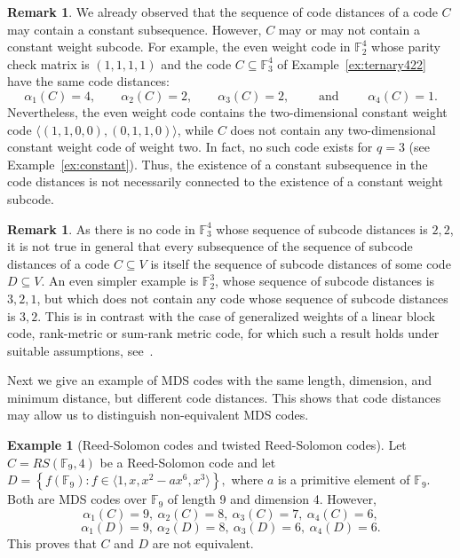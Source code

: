 \documentclass[12pt]{amsart}
\numberwithin{equation}{section}
\theoremstyle{definition}
\newtheorem{remark}[theorem]{Remark}
\newtheorem{example}[theorem]{Example}
\newcommand{\FF}{\mathbb{F}}
\begin{document}
\begin{remark}
We already observed that the sequence of code distances of a code $C$ may contain a constant subsequence. However, $C$ may or may not contain a constant weight subcode. For example, the even weight code in $\FF_2^4$ whose parity check matrix is $(1,1,1,1)$ and the code $C\subseteq\mathbb{F}_3^4$ of Example~\ref{ex:ternary422} have the same code distances:
\[\alpha_1(C)=4, \qquad \alpha_2(C)=2, \qquad \alpha_3(C)=2, \qquad \text{ and } \qquad \alpha_4(C)=1.\]
Nevertheless, the even weight code contains the two-dimensional constant weight code $\langle (1,1,0,0), (0,1,1,0)\rangle$, while $C$ does not contain any two-dimensional constant weight code of weight two. In fact, no such code exists for $q=3$ (see Example~\ref{ex:constant}).
Thus, the existence of a constant subsequence in the code distances is not necessarily connected to the existence of a constant weight subcode.
\end{remark}

\begin{remark}\label{rmk:subcode}
As there is no code in $\mathbb{F}_3^4$ whose sequence of subcode distances is $2,2$, it is not true in general that every subsequence of the sequence of subcode distances of a code $C\subseteq V$ is itself the sequence of subcode distances of some code $D\subseteq V$.
An even simpler example is $\FF_2^3$, whose sequence of subcode distances is $3,2,1$, but which does not contain any code whose sequence of subcode distances is $3,2$. This is in contrast with the case of generalized weights of a linear block code, rank-metric or sum-rank metric code, for which such a result holds under suitable assumptions, see~\cite[Theorem~3.1, Theorem~4.10, and Theorem~4.13]{GLMS23}.
\end{remark}

Next we give an example of MDS codes with the same length, dimension, and minimum distance, but different code distances. This shows that code distances may allow us to distinguish non-equivalent MDS codes.

\begin{example}[Reed-Solomon codes and twisted Reed-Solomon codes]\label{ex:RSvsERS}
Let $C=RS(\FF_9,4)$ be a Reed-Solomon code and let $D = \left\{ f(\FF_9) : f \in \langle 1,x,x^2-ax^6,x^3 \rangle \right\},$ where $a$ is a primitive element of $\mathbb{F}_9$. Both are MDS codes over $\FF_9$ of length 9 and dimension 4. However,
$$\alpha_1(C)=9,\ \alpha_2(C)=8,\ \alpha_3(C)=7,\ \alpha_4(C)=6,$$
$$\alpha_1(D)=9,\ \alpha_2(D)=8,\ \alpha_3(D)=6,\ \alpha_4(D)=6.$$
This proves that $C$ and $D$ are not equivalent. %
\end{example}
\end{document}
